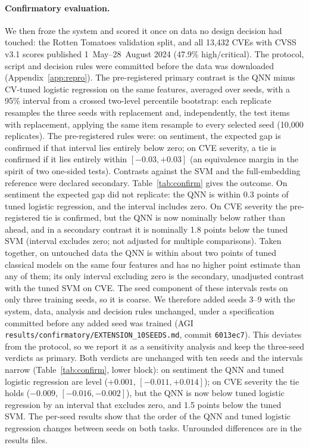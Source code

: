 \documentclass[11pt]{article}
\begin{document}
\paragraph{Confirmatory evaluation.} We then froze the system and scored it once on data no design decision had touched: the Rotten Tomatoes validation split, and all 13{,}432 CVEs with CVSS v3.1 scores published 1~May--28~August 2024 (47.9\% high/critical). The protocol, script and decision rules were committed before the data was downloaded (Appendix~\ref{app:repro}). The pre-registered primary contrast is the QNN minus CV-tuned logistic regression on the same features, averaged over seeds, with a 95\% interval from a crossed two-level percentile bootstrap: each replicate resamples the three seeds with replacement and, independently, the test items with replacement, applying the same item resample to every selected seed (10{,}000 replicates). The pre-registered rules were: on sentiment, the expected gap is confirmed if that interval lies entirely below zero; on CVE severity, a tie is confirmed if it lies entirely within $[-0.03, +0.03]$ (an equivalence margin in the spirit of two one-sided tests). Contrasts against the SVM and the full-embedding reference were declared secondary. Table~\ref{tab:confirm} gives the outcome. On sentiment the expected gap did not replicate: the QNN is within 0.3 points of tuned logistic regression, and the interval includes zero. On CVE severity the pre-registered tie is confirmed, but the QNN is now nominally below rather than ahead, and in a secondary contrast it is nominally 1.8 points below the tuned SVM (interval excludes zero; not adjusted for multiple comparisons). Taken together, on untouched data the QNN is within about two points of tuned classical models on the same four features and has no higher point estimate than any of them; its only interval excluding zero is the secondary, unadjusted contrast with the tuned SVM on CVE. The seed component of these intervals rests on only three training seeds, so it is coarse. We therefore added seeds 3--9 with the system, data, analysis and decision rules unchanged, under a specification committed before any added seed was trained (AGI \texttt{results/confirmatory/EXTENSION\_10SEEDS.md}, commit \texttt{6013ec7}). This deviates from the protocol, so we report it as a sensitivity analysis and keep the three-seed verdicts as primary. Both verdicts are unchanged with ten seeds and the intervals narrow (Table~\ref{tab:confirm}, lower block): on sentiment the QNN and tuned logistic regression are level ($+0.001$, $[-0.011, +0.014]$); on CVE severity the tie holds ($-0.009$, $[-0.016, -0.002]$), but the QNN is now below tuned logistic regression by an interval that excludes zero, and 1.5 points below the tuned SVM. The per-seed results show that the order of the QNN and tuned logistic regression changes between seeds on both tasks. Unrounded differences are in the results files.
\end{document}
